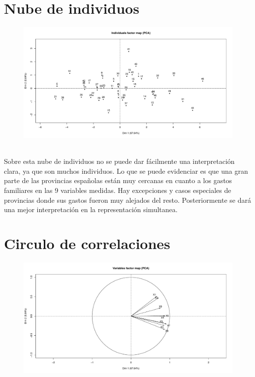 \documentclass[report,oneside]{revcoles}
\begin{document}
\section{Nube de individuos}
\begin{figure}[h!]
  \centering
  \includegraphics[scale=0.45]{FigurasUV/nubeind.pdf}
\end{figure}
~\\Sobre esta nube de individuos no se puede dar fácilmente una interpretación clara, ya que son muchos individuos. Lo que se puede evidenciar es que una gran parte de las provincias españolas están muy cercanas en cuanto a los gastos familiares en las 9 variables medidas. Hay excepciones y casos especiales de provincias donde sus gastos fueron muy alejados del resto. Posteriormente se dará una mejor interpretación en la representación simultanea.

\section{Circulo de correlaciones}
\begin{figure}[h!]
  \centering
  \includegraphics[scale=0.45]{FigurasUV/nubevar.pdf}
\end{figure}
\end{document}
